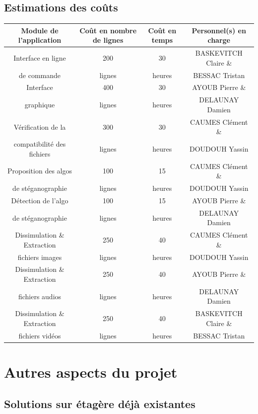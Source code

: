 \documentclass[11pt]{article}
\begin{document}
\subsection{Estimations des coûts}
\tiny
\hspace{2cm}
\begin{tabular}{|c|c|c|c|}
  \hline
  \textbf{Module de l'application} & \textbf{Coût en nombre de lignes} & \textbf{Coût en temps} & \textbf{Personnel(s) en charge} \\
  \hline
    Interface en ligne & 200 & 30 & BASKEVITCH Claire \& \\ 
    de commande & lignes & heures & BESSAC Tristan \\
  \hline
  Interface & 400 & 30 & AYOUB Pierre \& \\
  graphique & lignes & heures & DELAUNAY Damien \\
  \hline
  Vérification de la & 300 & 30 & CAUMES Clément \& \\
   compatibilité des fichiers & lignes & heures & DOUDOUH Yassin \\
  \hline
    Proposition des algos & 100 & 15 & CAUMES Clément \& \\
   de stéganographie & lignes & heures & DOUDOUH Yassin \\
  \hline
    Détection de l'algo & 100 & 15 & AYOUB Pierre \& \\
   de stéganographie & lignes & heures & DELAUNAY Damien \\
  \hline
  Dissimulation \& Extraction & 250 & 40 & CAUMES Clément \& \\
   fichiers images & lignes & heures & DOUDOUH Yassin \\
  \hline
  Dissimulation \& Extraction & 250 & 40 & AYOUB Pierre \& \\
   fichiers audios & lignes & heures & DELAUNAY Damien \\
     \hline
  Dissimulation \& Extraction & 250 & 40 & BASKEVITCH Claire \& \\
   fichiers vidéos & lignes & heures & BESSAC Tristan \\
  \hline
\end{tabular}
\small

\section{Autres aspects du projet}

\subsection{Solutions sur étagère déjà existantes}
\end{document}
